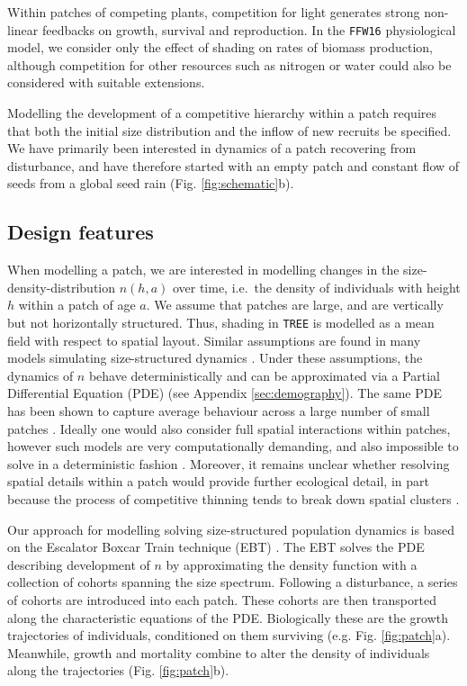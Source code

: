 \documentclass[a4paper,11pt]{article}
\begin{document}
Within patches of competing plants, competition for light generates
strong non-linear feedbacks on growth, survival and reproduction. In the
\texttt{FFW16} physiological model, we consider only the effect of
shading on rates of biomass production, although competition for other
resources such as nitrogen or water could also be considered with
suitable extensions.

Modelling the development of a competitive hierarchy within a patch
requires that both the initial size distribution and the inflow of new
recruits be specified. We have primarily been interested in dynamics of
a patch recovering from disturbance, and have therefore started with an
empty patch and constant flow of seeds from a global seed rain (Fig.
\ref{fig:schematic}b).

\subsection{Design features}

When modelling a patch, we are interested in modelling changes in the
size-density-distribution \(n(h,a)\) over time, i.e.~the density of
individuals with height \(h\) within a patch of age \(a\). We assume
that patches are large, and are vertically but not horizontally
structured. Thus, shading in \texttt{TREE} is modelled as a mean field with
respect to spatial layout. Similar assumptions are found in many models
simulating size-structured dynamics
\citep{Moorcroft-2001, Huston-1987, Smith-2014}. Under these
assumptions, the dynamics of \(n\) behave deterministically and can be
approximated via a Partial Differential Equation (PDE) (see Appendix
\ref{sec:demography}). The same PDE has been shown to capture average behaviour
across a large number of small patches \citep{Moorcroft-2001}. Ideally
one would also consider full spatial interactions within patches,
however such models are very computationally demanding, and also
impossible to solve in a deterministic fashion \citep{Pacala-1996}.
Moreover, it remains unclear whether resolving spatial details within a
patch would provide further ecological detail, in part because the
process of competitive thinning tends to break down spatial clusters
\citep{Strigul-2008}.

Our approach for modelling solving size-structured population dynamics
is based on the Escalator Boxcar Train technique (EBT)
\citep{Deroos-1997, Deroos-1992, Deroos-1988}. The EBT solves the PDE
describing development of \(n\) by approximating the density function
with a collection of cohorts spanning the size spectrum. Following a
disturbance, a series of cohorts are introduced into each patch. These
cohorts are then transported along the characteristic equations of the
PDE. Biologically these are the growth trajectories of individuals,
conditioned on them surviving (e.g. Fig. \ref{fig:patch}a). Meanwhile,
growth and mortality combine to alter the density of individuals along
the trajectories (Fig. \ref{fig:patch}b).
\end{document}
